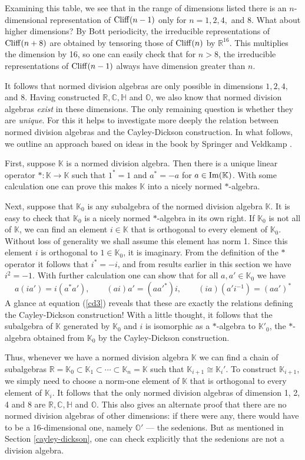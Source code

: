 \documentclass[12pt]{article}
\newcommand\R{{\mathbb R}}
\newcommand\C{{\mathbb C}}
\renewcommand\H{{\mathbb H}}
\newcommand\K{{\mathbb K}}
\renewcommand\O{{\mathbb O}}
\newcommand{\Cliff}{{\rm Cliff}}
\renewcommand{\Im}{{\rm Im}}
\newcommand{\iso}{\cong}
\newcommand{\maps}{\colon}
\begin{document}
\noindent 
Examining this table, we see that in the range of dimensions listed
there is an $n$-dimensional representation of $\Cliff(n-1)$ only for $n
= 1,2,4,$ and $8$.  What about higher dimensions?  By Bott periodicity,
the irreducible representations of $\Cliff(n+8)$ are obtained by
tensoring those of $\Cliff(n)$ by $\R^{16}$.  This multiplies the
dimension by 16, so one can easily check that for $n > 8$, the
irreducible representations of $\Cliff(n-1)$ always have dimension
greater than $n$.  

It follows that normed division algebras are only possible in dimensions  
$1,2,4,$ and $8$.  Having constructed $\R,\C,\H$ and $\O$, we also know  
that normed division algebras {\it exist} in these dimensions.  The only  
remaining question is whether they are {\it unique}.  For this it helps  
to investigate more deeply the relation between normed division algebras  
and the Cayley-Dickson construction.   In what follows, we outline an  
approach based on ideas in the book by Springer and Veldkamp \cite{SV}.   
  
First, suppose $\K$ is a normed division algebra.  Then there is a unique  
linear operator $\ast \maps \K \to \K$ such that $1^\ast = 1$ and $a^\ast  
= -a$ for $a \in \Im(\K)$.  With some calculation one can prove this  
makes $\K$ into a nicely normed $\ast$-algebra.    
  
Next, suppose that $\K_0$ is any subalgebra of the normed division algebra  
$\K$.  It is easy to check that $\K_0$ is a nicely normed $\ast$-algebra in  
its own right.  If $\K_0$ is not all of $\K$, we can find an element $i \in 
\K$ that is orthogonal to every element of $\K_0$.   Without loss of 
generality we shall assume this element has norm 1.  Since this element 
$i$ is orthogonal to $1 \in \K_0$, it is imaginary.  From the  definition 
of the $\ast$ operator it follows that $i^\ast = -i$, and from results 
earlier in this section we have $i^2 = -1$.  With  further calculation 
one can show that for all $a,a' \in \K_0$ we have   
\[  a(ia') = i(a^* a') ,  \qquad   
    (ai)a' = (aa'^*)i,      \qquad   
    (ia)(a'i^{-1}) = (aa')^*  \]  
A glance at equation (\ref{cd3}) reveals that these are exactly the  
relations defining the Cayley-Dickson construction!  With a little  
thought, it follows that the subalgebra of $\K$ generated by $\K_0$ and $i$  
is isomorphic as a $\ast$-algebra to $\K'_0$, the $\ast$-algebra obtained  
from $\K_0$ by the Cayley-Dickson construction.  
  
Thus, whenever we have a normed division algebra $\K$ we can find a 
chain of subalgebras $\R = \K_0 \subset \K_1 \subset \cdots \subset 
\K_n = \K$ such that $\K_{i+1} \iso \K_i'$.  To construct $\K_{i+1}$, we 
simply need to choose a norm-one element of $\K$ that is orthogonal to 
every element of $\K_i$.    It follows that the only normed division 
algebras of dimension 1, 2, 4 and 8 are $\R,\C,\H$ and $\O$.   This also 
gives an alternate proof that there are no normed division algebras of 
other dimensions: if there were any, there would have to be a 
16-dimensional one, namely $\O'$ --- the sedenions.  But as mentioned
in Section \ref{cayley-dickson}, one can check explicitly that the 
sedenions are not a division algebra.    
\end{document}
